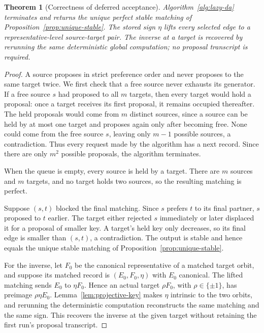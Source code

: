 \documentclass[11pt]{amsart}
\newtheorem{theorem}{Theorem}[section]
\theoremstyle{definition}
\theoremstyle{remark}
\begin{document}
\begin{theorem}[Correctness of deferred acceptance]\label{thm:DA-correct}
Algorithm~\ref{alg:lazy-da} terminates and returns the unique perfect stable
matching of Proposition~\ref{prop:unique-stable}.  The stored sign
$\eta$ lifts every selected edge to a representative-level source-target
pair.  The inverse at a target is recovered by rerunning the same deterministic global
computation; no proposal transcript is required.
\end{theorem}

\begin{proof}
A source proposes in strict preference order and never proposes to the same
target twice.  We first check that a free source never exhausts its generator.
If a free source $s$ had proposed to all $m$ targets, then every target would
hold a proposal: once a target receives its first proposal, it remains
occupied thereafter.  The held proposals would come from $m$ distinct
sources, since a source can be held by at most one target and proposes again
only after becoming free.  None could come from the free source $s$, leaving
only $m-1$ possible sources, a contradiction.  Thus every request made by the
algorithm has a next record.  Since there are only $m^2$ possible proposals,
the algorithm terminates.

When the queue is empty, every source is held by a target.  There are $m$
sources and $m$ targets, and no target holds two sources, so the resulting
matching is perfect.

Suppose $(s,t)$ blocked the final matching.  Since $s$ prefers $t$ to its final
partner, $s$ proposed to $t$ earlier.  The target either rejected $s$
immediately or later displaced it for a proposal of smaller key.  A target's
held key only decreases, so its final edge is smaller than $(s,t)$, a
contradiction.  The output is stable and hence equals the unique stable
matching of Proposition~\ref{prop:unique-stable}.

For the inverse, let $F_0$ be the canonical representative of a matched target
orbit, and suppose its matched record is $(E_0,F_0,\eta)$ with $E_0$ canonical.
The lifted matching sends $E_0$ to $\eta F_0$.  Hence an actual target
$\rho F_0$, with $\rho\in\{\pm1\}$, has preimage $\rho\eta E_0$.
Lemma~\ref{lem:projective-key} makes $\eta$ intrinsic to the two orbits, and
rerunning the deterministic computation reconstructs the same matching and
the same sign.  This recovers the inverse at the given target without
retaining the first run's proposal transcript.
\end{proof}
\end{document}
